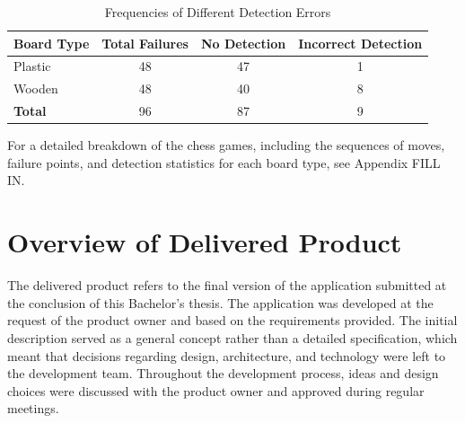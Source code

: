 \newpage


\begin{figure}[htbp]
\centering
{}
\end{figure}

\begin{table}[htbp]
\centering
\caption{Frequencies of Different Detection Errors}
\begin{tabular}{lccc}
\toprule
\textbf{Board Type} & \textbf{Total Failures} & \textbf{No Detection} & \textbf{Incorrect Detection} \\
\midrule
Plastic & 48 & 47 & 1 \\
Wooden & 48 & 40 & 8 \\
\midrule
\textbf{Total} & 96 & 87 & 9 \\
\bottomrule
\end{tabular}
\end{table}

For a detailed breakdown of the chess games, including the sequences of moves, failure points, and detection statistics for each board type, see Appendix FILL IN.




\section{Overview of Delivered Product}
The delivered product refers to the final version of the application submitted at the conclusion of this Bachelor’s thesis. The application was developed at the request of the product owner and based on the requirements provided. The initial description served as a general concept rather than a detailed specification, which meant that decisions regarding design, architecture, and technology were left to the development team. Throughout the development process, ideas and design choices were discussed with the product owner and approved during regular meetings. \\


